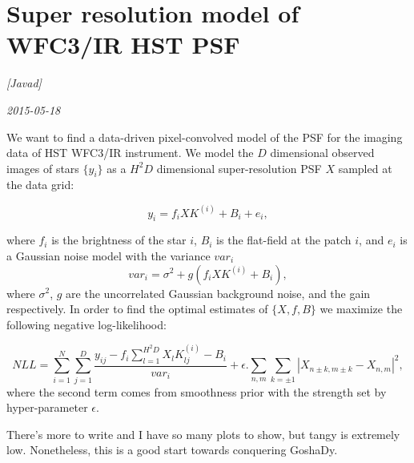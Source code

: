 \documentclass[12pt, pdftex]{article}
\begin{document}
\section*{Super resolution model of WFC3/IR HST PSF}
\noindent
\textsl{[Javad]}

\noindent
\textsl{2015-05-18}

We want to find a data-driven pixel-convolved model of the PSF for the imaging data of HST WFC3/IR
instrument. We model the $D$ dimensional observed images of stars $\{y_i\}$ as a $H^2D$ dimensional 
super-resolution PSF $X$ sampled at the data grid:

\begin{equation}
y_i= f_iXK^{(i)} + B_i + e_i,
\end{equation}

where $f_i$ is the brightness of the star $i$, $B_i$ is the flat-field at the patch $i$, and $e_i$ is 
a Gaussian noise model with the variance $var_i$
\begin{equation}
var_i = \sigma^{2} + g(f_iXK^{(i)} + B_i),
\end{equation}
where $\sigma^{2}$, $g$ are the uncorrelated Gaussian background noise, and the gain respectively.
In order to find the optimal estimates of $\{X,f,B\}$ we maximize the following negative log-likelihood:

\begin{equation}
NLL = \sum_{i=1}^{N}\sum_{j=1}^{D} \frac{y_{ij}-f_{i}\sum_{l=1}^{H^{2}D}X_{l}K^{(i)}_{lj}-B_{i}}{var_{i}} + \epsilon.\sum_{n,m}\sum_{k=\pm1} |X_{n\pm k,m\pm k}-X_{n,m}|^{2},
\end{equation}
where the second term comes from smoothness prior with the strength set by hyper-parameter $\epsilon$.

There's more to write and I have so many plots to show, but tangy is extremely low.
Nonetheless, this is a good start towards conquering GoshaDy.
 
\end{document}
